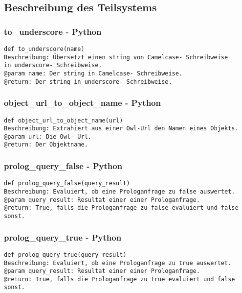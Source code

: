 \documentclass{suturo}
\begin{document}
\begin{figure}[!htb]
\end{figure}
      
\subsection{Beschreibung des Teilsystems}

\subsubsection{to\_underscore - Python}
\begin{verbatim}
def to_underscore(name)
Beschreibung: Übersetzt einen string von Camelcase- Schreibweise 
in underscore- Schreibweise. 
@param name: Der string in Camelcase- Schreibweise.
@return: Der string in underscore- Schreibweise.
\end{verbatim}

\subsubsection{object\_url\_to\_object\_name - Python}
\begin{verbatim}
def object_url_to_object_name(url)
Beschreibung: Extrahiert aus einer Owl-Url den Namen eines Objekts.
@param url: Die Owl- Url.
@return: Der Objektname.
\end{verbatim}


\subsubsection{prolog\_query\_false - Python}
\begin{verbatim}
def prolog_query_false(query_result)
Beschreibung: Evaluiert, ob eine Prologanfrage zu false auswertet.
@param query_result: Resultat einer einer Prologanfrage.
@return: True, falls die Prologanfrage zu false evaluiert und false sonst.
\end{verbatim}

\subsubsection{prolog\_query\_true - Python}
\begin{verbatim}
def prolog_query_true(query_result)
Beschreibung: Evaluiert, ob eine Prologanfrage zu true auswertet.
@param query_result: Resultat einer einer Prologanfrage.
@return: True, falls die Prologanfrage zu true evaluiert und false sonst.
\end{verbatim}
\end{document}
